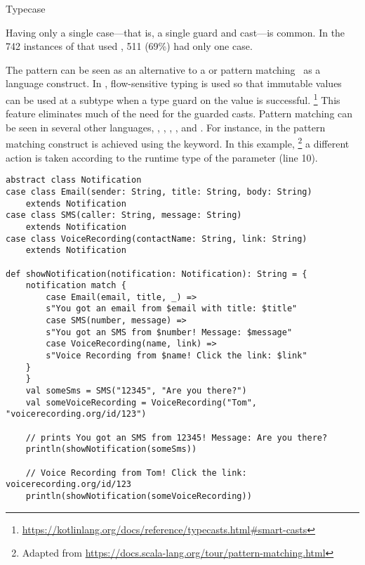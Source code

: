 \begin{pattern}{Typecase}

\discussion{}
Having only a single case---that is, a single guard and cast---is common.
In the 742 instances of \thisp{} that used , 511
(69\%) had only one case.

The \thisp{} pattern can be seen as an \adhoc{} alternative to a
 or pattern matching~\citep{milnerProposalStandardML1984} as a
language construct.
In \kotlin{}, flow-sensitive typing is used so that immutable values can be
used at a subtype when a type guard on the value is successful.%
\footnote{\url{https://kotlinlang.org/docs/reference/typecasts.html\#smart-casts}}
This feature eliminates much of the need for the guarded casts.
Pattern matching can be seen in several other languages, \eg, \ml{}, \scala{}, \csharp{}, and \haskell{}.
For instance, in \scala{} the pattern matching construct is achieved using the  keyword.
In this example,%
\footnote{Adapted from \url{https://docs.scala-lang.org/tour/pattern-matching.html}}
a different action is taken according to the runtime type of the parameter  (line 10).

\begin{verbatim}
abstract class Notification
case class Email(sender: String, title: String, body: String)
	extends Notification
case class SMS(caller: String, message: String)
	extends Notification
case class VoiceRecording(contactName: String, link: String)
	extends Notification

def showNotification(notification: Notification): String = {
	notification match {
		case Email(email, title, _) =>
		s"You got an email from $email with title: $title"
		case SMS(number, message) =>
		s"You got an SMS from $number! Message: $message"
		case VoiceRecording(name, link) =>
		s"Voice Recording from $name! Click the link: $link"
	}
	}
	val someSms = SMS("12345", "Are you there?")
	val someVoiceRecording = VoiceRecording("Tom", "voicerecording.org/id/123")
	
	// prints You got an SMS from 12345! Message: Are you there?
	println(showNotification(someSms))
	
	// Voice Recording from Tom! Click the link: voicerecording.org/id/123	
	println(showNotification(someVoiceRecording))
\end{verbatim}


\end{pattern}
